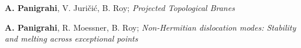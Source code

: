 \begin{cventries}
{\begin{cvitems}
{	  	}
	  	\item{\textbf{A. Panigrahi}, V. Juri\v{c}i\'c, B. Roy; \textit{Projected Topological Branes}}
      	\item{\textbf{A. Panigrahi}, R. Moessner, B. Roy; \textit{Non-Hermitian dislocation modes: Stability and melting across exceptional points} }
      \end{cvitems}
    }


\end{cventries}
